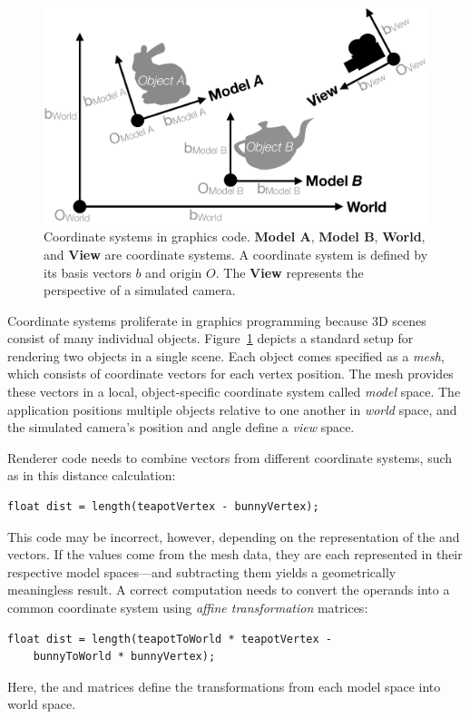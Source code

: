 \begin{figure}
\centering
\includegraphics[width=\linewidth]{fig/coordinate-spaces-2.pdf}
\caption{Coordinate systems in graphics code.
	\textbf{Model A}, \textbf{Model B}, \textbf{World}, and \textbf{View} are coordinate systems.
	A coordinate system is defined by its basis vectors $b$ and origin $O$.
	The \textbf{View} represents the perspective of a simulated camera.
}
\label{fig:spaces}
\end{figure}

Coordinate systems proliferate in graphics programming because 3D scenes consist of many individual objects.
Figure~\ref{fig:spaces} depicts a standard setup for rendering two objects in a single scene.
Each object comes specified as a \emph{mesh}, which consists of coordinate vectors for each vertex position.
The mesh provides these vectors in a local, object-specific coordinate system called \emph{model} space.
The application positions multiple objects relative to one another in \emph{world} space,
and the simulated camera's position and angle define a \emph{view} space.

Renderer code needs to combine vectors from different coordinate systems, such as in this distance calculation:
%
\begin{lstlisting}
float dist = length(teapotVertex - bunnyVertex);
\end{lstlisting}
%
This code may be incorrect, however, depending on the representation of the  and  vectors.
If the values come from the mesh data, they are each represented in their respective model spaces---and subtracting them yields a geometrically meaningless result.
A correct computation needs to convert the operands into a common coordinate system using \emph{affine transformation} matrices:
%
\begin{lstlisting}
float dist = length(teapotToWorld * teapotVertex - 
	bunnyToWorld * bunnyVertex);
\end{lstlisting}
%
Here, the  and  matrices define the transformations from each model space into world space.

